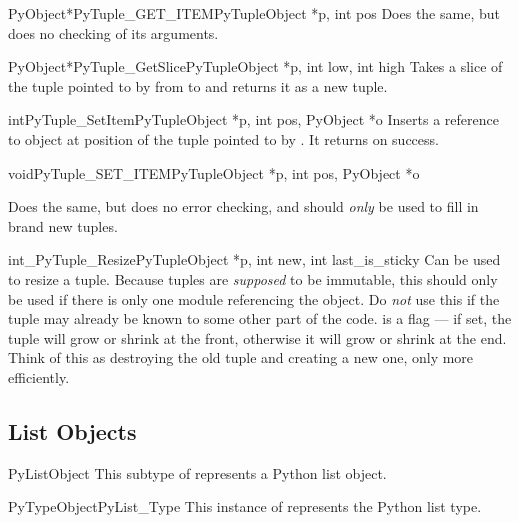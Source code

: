 \documentclass{manual}
\begin{document}
\begin{cfuncdesc}{PyObject*}{PyTuple_GET_ITEM}{PyTupleObject *p, int pos}
Does the same, but does no checking of its arguments.
\end{cfuncdesc}

\begin{cfuncdesc}{PyObject*}{PyTuple_GetSlice}{PyTupleObject *p,
            int low,
            int high}
Takes a slice of the tuple pointed to by  from
 to  and returns it as a new tuple.
\end{cfuncdesc}

\begin{cfuncdesc}{int}{PyTuple_SetItem}{PyTupleObject *p,
            int pos,
            PyObject *o}
Inserts a reference to object  at position  of
the tuple pointed to by . It returns  on success.
\end{cfuncdesc}

\begin{cfuncdesc}{void}{PyTuple_SET_ITEM}{PyTupleObject *p,
            int pos,
            PyObject *o}

Does the same, but does no error checking, and
should \emph{only} be used to fill in brand new tuples.
\end{cfuncdesc}

\begin{cfuncdesc}{int}{_PyTuple_Resize}{PyTupleObject *p,
            int new,
            int last_is_sticky}
Can be used to resize a tuple. Because tuples are
\emph{supposed} to be immutable, this should only be used if there is only
one module referencing the object. Do \emph{not} use this if the tuple may
already be known to some other part of the code.  is
a flag --- if set, the tuple will grow or shrink at the front, otherwise
it will grow or shrink at the end. Think of this as destroying the old
tuple and creating a new one, only more efficiently.
\end{cfuncdesc}


\subsection{List Objects \label{listObjects}}

\begin{ctypedesc}{PyListObject}
This subtype of  represents a Python list object.
\end{ctypedesc}

\begin{cvardesc}{PyTypeObject}{PyList_Type}
This instance of  represents the Python list type.
\end{cvardesc}
\end{document}
